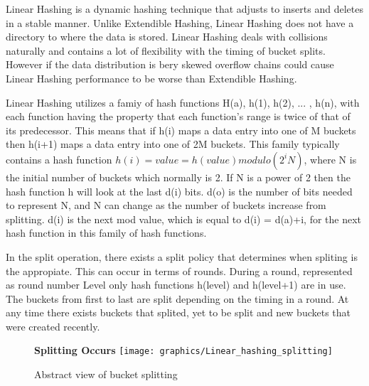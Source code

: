 \documentclass[letterpaper, 12pt]{article}
\begin{document}
Linear Hashing is a dynamic hashing technique that adjusts to inserts and deletes in a stable manner.
Unlike Extendible Hashing, Linear Hashing does not have a directory to where the data is
stored. Linear Hashing deals with collisions naturally and contains a lot of flexibility with
the timing of bucket splits. However if the data distribution is bery skewed overflow chains could cause Linear Hashing performance to be
worse than Extendible Hashing.
\par\vspace{\baselineskip}
Linear Hashing utilizes a famiy of hash functions H(a), h(1), h(2), ... , h(n), with each function having the property that each function's range is twice of that of its predecessor. This means that if h(i) maps a data entry into one of M buckets then h(i+1) maps a data entry into one of 2M buckets. This family typically contains a hash function $ h(i) = value = h(value) modulo (2^i N) $, where N is the initial number of buckets which normally is 2. If N is a power of 2 then the hash function h will look at the last d(i) bits. d(o) is the number of bits needed to represent N, and N can change as the number of buckets increase from splitting. d(i) is the next mod value, which is equal to d(i) = d(a)+i, for the next hash function in this family of hash functions.
\par\vspace{\baselineskip}
In the split operation, there exists a split policy that determines when spliting is the appropiate. This can occur in terms of rounds. During a round, represented as round number Level only hash functions h(level) and h(level+1) are in use. The buckets from first to last are split depending on the timing in a round. At any time there exists buckets that splited, yet to be split and new buckets that were created recently.
\par\vspace{\baselineskip}
\begin{figure}
  \centering
  \textbf{Splitting Occurs}
  \texttt{[image: graphics/Linear\_hashing\_splitting]}
  \cite{ramakrishnan2000database}
  \caption{Abstract view of bucket splitting}
\end{figure}
\end{document}
